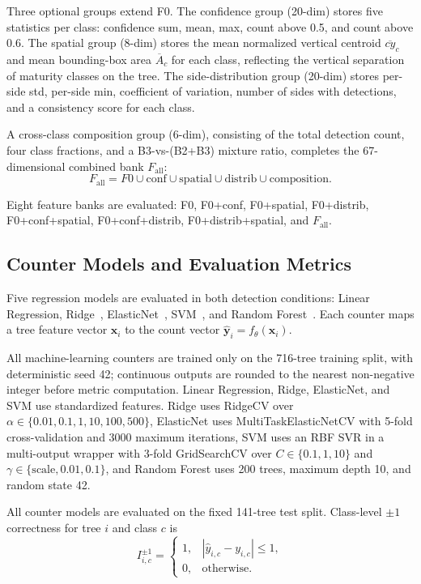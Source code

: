 \documentclass[conference]{IEEEtran}
\begin{document}
Three optional groups extend F0. The confidence group (20-dim) stores five
statistics per class: confidence sum, mean, max, count above 0.5, and count
above 0.6. The spatial group (8-dim) stores the mean normalized vertical
centroid $\overline{cy}_c$ and mean bounding-box area $\overline{A}_c$ for each
class, reflecting the vertical separation of maturity classes on the tree. The
side-distribution group (20-dim) stores per-side std, per-side min, coefficient
of variation, number of sides with detections, and a consistency score for each
class.

A cross-class composition group (6-dim), consisting of the total detection
count, four class fractions, and a B3-vs-(B2+B3) mixture ratio, completes the
67-dimensional combined bank $F_{\text{all}}$:
\begin{equation*}
  F_{\text{all}} = F0 \cup \text{conf} \cup \text{spatial}
                      \cup \text{distrib} \cup \text{composition}.
\end{equation*}

Eight feature banks are evaluated: F0, F0+conf, F0+spatial, F0+distrib,
F0+conf+spatial, F0+conf+distrib, F0+distrib+spatial, and $F_{\text{all}}$.

\subsection{Counter Models and Evaluation Metrics}

Five regression models are evaluated in both detection conditions: Linear
Regression, Ridge~\cite{ref19}, ElasticNet~\cite{ref17}, SVM~\cite{ref20}, and
Random Forest~\cite{ref18}. Each counter maps a tree feature vector
$\mathbf{x}_i$ to the count vector $\hat{\mathbf{y}}_i =
f_{\theta}(\mathbf{x}_i)$.

All machine-learning counters are trained only on the 716-tree training split,
with deterministic seed 42; continuous outputs are rounded to the nearest
non-negative integer before metric computation. Linear Regression, Ridge,
ElasticNet, and SVM use standardized features. Ridge uses RidgeCV over
$\alpha \in \{0.01,0.1,1,10,100,500\}$, ElasticNet uses MultiTaskElasticNetCV
with 5-fold cross-validation and 3000 maximum iterations, SVM uses an RBF SVR
in a multi-output wrapper with 3-fold GridSearchCV over
$C \in \{0.1,1,10\}$ and $\gamma \in \{\text{scale},0.01,0.1\}$, and Random
Forest uses 200 trees, maximum depth 10, and random state 42.

All counter models are evaluated on the fixed 141-tree test split. Class-level
$\pm 1$ correctness for tree $i$ and class $c$ is
\begin{equation}
  I_{i,c}^{\pm 1} =
  \begin{cases}
    1, & |\hat{y}_{i,c} - y_{i,c}| \leq 1, \\
    0, & \text{otherwise}.
  \end{cases}
\end{equation}
\end{document}
